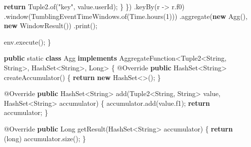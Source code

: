 \documentclass[cn,11pt,chinese]{elegantbook}
\newenvironment{Shaded}{}{}
\newcommand{\AttributeTok}[1]{\textcolor[rgb]{0.49,0.56,0.16}{#1}}
\newcommand{\BuiltInTok}[1]{#1}
\newcommand{\DataTypeTok}[1]{\textcolor[rgb]{0.56,0.13,0.00}{#1}}
\newcommand{\DecValTok}[1]{\textcolor[rgb]{0.25,0.63,0.44}{#1}}
\newcommand{\FunctionTok}[1]{\textcolor[rgb]{0.02,0.16,0.49}{#1}}
\newcommand{\KeywordTok}[1]{\textcolor[rgb]{0.00,0.44,0.13}{\textbf{#1}}}
\newcommand{\NormalTok}[1]{#1}
\newcommand{\StringTok}[1]{\textcolor[rgb]{0.25,0.44,0.63}{#1}}
\begin{document}
\begin{Shaded}
\begin{Highlighting}[]
                    \KeywordTok{return}\NormalTok{ Tuple2.}\FunctionTok{of}\NormalTok{(}\StringTok{"key"}\NormalTok{, value.}\FunctionTok{userId}\NormalTok{);}
\NormalTok{                \}}
\NormalTok{            \})}
\NormalTok{            .}\FunctionTok{keyBy}\NormalTok{(r {-}\textgreater{} r.}\FunctionTok{f0}\NormalTok{)}
\NormalTok{            .}\FunctionTok{window}\NormalTok{(TumblingEventTimeWindows.}\FunctionTok{of}\NormalTok{(}\BuiltInTok{Time}\NormalTok{.}\FunctionTok{hours}\NormalTok{(}\DecValTok{1}\NormalTok{)))}
\NormalTok{            .}\FunctionTok{aggregate}\NormalTok{(}\KeywordTok{new} \FunctionTok{Agg}\NormalTok{(), }\KeywordTok{new} \FunctionTok{WindowResult}\NormalTok{())}
\NormalTok{            .}\FunctionTok{print}\NormalTok{();}

\NormalTok{        env.}\FunctionTok{execute}\NormalTok{();}
\NormalTok{    \}}

    \KeywordTok{public} \DataTypeTok{static} \KeywordTok{class}\NormalTok{ Agg }\KeywordTok{implements}\NormalTok{ AggregateFunction\textless{}Tuple2\textless{}}\BuiltInTok{String}\NormalTok{, }\BuiltInTok{String}\NormalTok{\textgreater{}, }\BuiltInTok{HashSet}\NormalTok{\textless{}}\BuiltInTok{String}\NormalTok{\textgreater{}, }\BuiltInTok{Long}\NormalTok{\textgreater{} \{}
        \AttributeTok{@Override}
        \KeywordTok{public} \BuiltInTok{HashSet}\NormalTok{\textless{}}\BuiltInTok{String}\NormalTok{\textgreater{} }\FunctionTok{createAccumulator}\NormalTok{() \{}
            \KeywordTok{return} \KeywordTok{new} \BuiltInTok{HashSet}\NormalTok{\textless{}\textgreater{}();}
\NormalTok{        \}}

        \AttributeTok{@Override}
        \KeywordTok{public} \BuiltInTok{HashSet}\NormalTok{\textless{}}\BuiltInTok{String}\NormalTok{\textgreater{} }\FunctionTok{add}\NormalTok{(Tuple2\textless{}}\BuiltInTok{String}\NormalTok{, }\BuiltInTok{String}\NormalTok{\textgreater{} value, }\BuiltInTok{HashSet}\NormalTok{\textless{}}\BuiltInTok{String}\NormalTok{\textgreater{} accumulator) \{}
\NormalTok{            accumulator.}\FunctionTok{add}\NormalTok{(value.}\FunctionTok{f1}\NormalTok{);}
            \KeywordTok{return}\NormalTok{ accumulator;}
\NormalTok{        \}}

        \AttributeTok{@Override}
        \KeywordTok{public} \BuiltInTok{Long} \FunctionTok{getResult}\NormalTok{(}\BuiltInTok{HashSet}\NormalTok{\textless{}}\BuiltInTok{String}\NormalTok{\textgreater{} accumulator) \{}
            \KeywordTok{return}\NormalTok{ (}\DataTypeTok{long}\NormalTok{) accumulator.}\FunctionTok{size}\NormalTok{();}
\NormalTok{        \}}


\end{Highlighting}
\end{Shaded}
\end{document}
